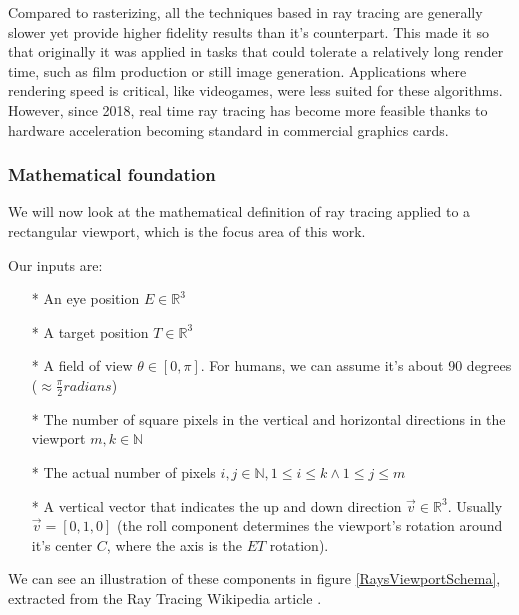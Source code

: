 Compared to rasterizing, all the techniques based in ray tracing are generally slower yet provide higher fidelity results than it's counterpart. This made it so that originally it was applied in tasks that could tolerate a relatively long render time, such as film production or still image generation. Applications where rendering speed is critical, like videogames, were less suited for these algorithms. However, since 2018, real time ray tracing has become more feasible thanks to hardware acceleration becoming standard in commercial graphics cards.

\subsubsection{Mathematical foundation}
We will now look at the mathematical definition of ray tracing applied to a rectangular viewport, which is the focus area of this work.

Our inputs are:
\begin{itemize}
  \item[*]{An eye position $E \in \mathbb{R}^3$}
  \item[*]{A target position $T \in \mathbb{R}^3$}
  \item[*]{A field of view $\theta \in [0, \pi]$. For humans, we can assume it's about 90 degrees ($\approx \frac{\pi}{2} radians $)}
  \item[*]{The number of square pixels in the vertical and horizontal directions in the viewport $m, k \in \mathbb{N}$}
  \item[*]{The actual number of pixels $i, j \in \mathbb{N}, 1 \leq i \leq k \land 1 \leq j \leq m$}
  \item[*]{A vertical vector that indicates the up and down direction $\overrightarrow{v} \in \mathbb{R}^3$. Usually $\overrightarrow{v} = [0, 1, 0]$ (the roll component determines the viewport's rotation around it's center $C$, where the axis is the $ET$ rotation).}
\end{itemize}

We can see an illustration of these components in figure \ref{RaysViewportSchema}, extracted from the Ray Tracing Wikipedia article \cite{WikipediaRT}.

